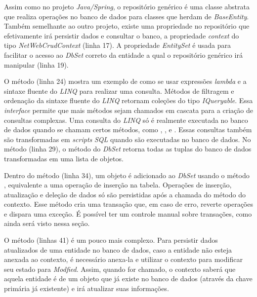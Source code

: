 

Assim como no projeto \textit{Java/Spring}, o repositório genérico é uma classe abstrata que realiza operações no banco de dados para classes que herdam de \textit{BaseEntity}. Também semelhante ao outro projeto, existe uma propriedade no repositório que efetivamente irá persistir dados e consultar o banco, a propriedade \textit{context} do tipo \textit{NetWebCrudContext} (linha 17). A propriedade \textit{EntitySet} é usada para facilitar o acesso ao \textit{DbSet} correto da entidade a qual o repositório genérico irá manipular (linha 19).

O método  (linha 24) mostra um exemplo de como se usar expressões \textit{lambda} e a sintaxe fluente do \textit{LINQ} para realizar uma consulta. Métodos de filtragem e ordenação da sintaxe fluente do \textit{LINQ} retornam coleções do tipo \textit{IQueryable}. Essa \textit{interface} permite que mais métodos sejam chamados em cascata para a criação de consultas complexas. Uma consulta do \textit{LINQ} só é realmente executada no banco de dados quando se chamam certos métodos, como , ,  e .  Essas consultas também são transformadas em \textit{scripts} \textit{SQL} quando são executadas no banco de dados. No método  (linha 29), o método  do \textit{DbSet} retorna todas as tuplas do banco de dados transformadas em uma lista de objetos.

Dentro do método  (linha 34), um objeto é adicionado ao \textit{DbSet} usando o método , equivalente a uma operação de inserção na tabela. Operações de inserção, atualização e deleção de dados só são persistidas após a chamada do método  do contexto. Esse método cria uma transação que, em caso de erro, reverte operações e dispara uma exceção. É possível ter um controle manual sobre transações, como ainda será visto nessa seção.

O método  (linhas 41) é um pouco mais complexo. Para persistir dados atualizados de uma entidade no banco de dados, caso a entidade não esteja anexada ao contexto, é necessário anexa-la e utilizar o contexto para modificar seu estado para \textit{Modfied}. Assim, quando  for chamado, o contexto saberá que aquela entidade é de um objeto que já existe no banco de dados (através da chave primária já existente) e irá atualizar suas informações.

